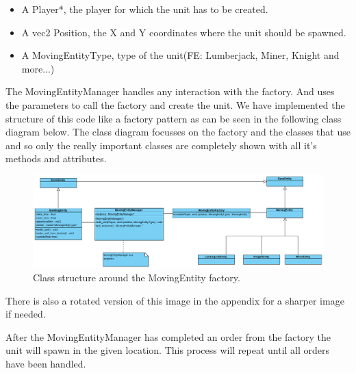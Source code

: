\begin{itemize}  
\item A Player*, the player for which the unit has to be created.
\item A vec2 Position, the X and Y coordinates where the unit should be spawned.
\item A MovingEntityType, type of the unit(FE: Lumberjack, Miner, Knight and more...)
\end{itemize}
The MovingEntityManager handles any interaction with the factory. And uses the parameters to call the factory and create the unit. We have implemented the structure of this code like a factory pattern as can be seen in the following class diagram below. The class diagram focusses on the factory and the classes that use and so only the really important classes are completely shown with all it's methods and attributes.  
\begin{figure}[!htb]
    \centering
    \includegraphics[scale=0.55]{res/MovingEntityFactoryClass.png}
    \caption{Class structure around the MovingEntity factory.}
\end{figure}
\newpage
 
There is also a rotated version of this image in the appendix for a sharper image if needed.

After the MovingEntityManager has completed an order from the factory the unit will spawn in the given location. This process will repeat until all orders have been handled.





